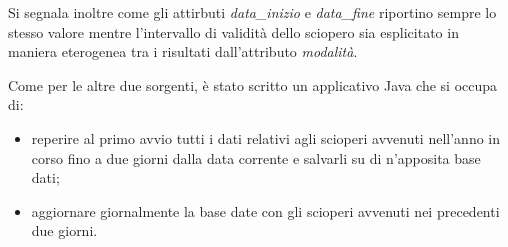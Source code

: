 Si segnala inoltre come gli attirbuti \textit{data\_inizio} e \textit{data\_fine} 
riportino sempre lo stesso valore mentre l'intervallo di validità dello sciopero
sia esplicitato in maniera eterogenea tra i risultati dall'attributo
\textit{modalità}.

Come per le altre due sorgenti, è stato scritto un applicativo Java che si occupa
di:
\begin{itemize}
\item reperire al primo avvio tutti i dati relativi agli scioperi avvenuti
nell'anno in corso fino a due giorni dalla data corrente e salvarli su di
n'apposita base dati;
\item aggiornare giornalmente la base date con gli scioperi avvenuti nei
precedenti due giorni.
\end{itemize}
